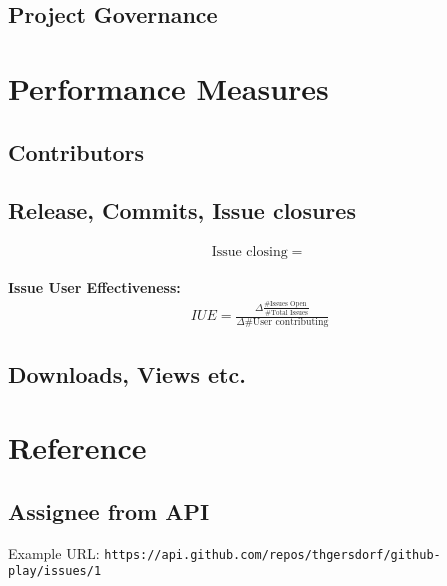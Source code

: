 \documentclass[a4paper,10pt]{article}
\begin{document}
\subsection{Project Governance}









\section{Performance Measures}
\subsection{Contributors}
\subsection{Release, Commits, Issue closures}

\begin{align}
 \text{Issue closing} = \frac{}{}
\end{align}


\textbf{Issue User Effectiveness:} 
\begin{align}
 IUE = \frac{\Delta \frac{\text{\# Issues Open }}{\text{\# Total Issues}}}{\Delta\text{\# User contributing}}
\end{align}



\subsection{Downloads, Views etc.}


\section{Reference}
\subsection{Assignee from API}
Example URL: \texttt{https://api.github.com/repos/thgersdorf/github-play/issues/1}
\end{document}
